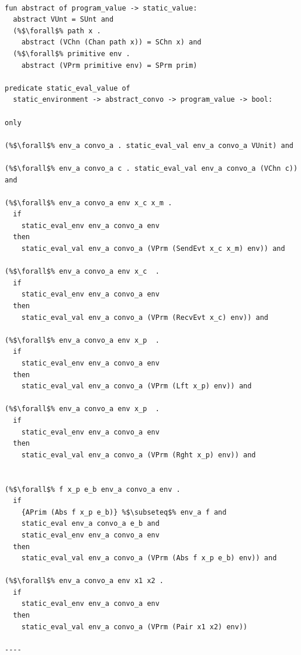 \documentclass{article}
\begin{document}
\begin{lstlisting}[language=logic, escapechar=\%]

fun abstract of program_value -> static_value:
  abstract VUnt = SUnt and 
  (%$\forall$% path x . 
    abstract (VChn (Chan path x)) = SChn x) and
  (%$\forall$% primitive env .
    abstract (VPrm primitive env) = SPrm prim)

predicate static_eval_value of
  static_environment -> abstract_convo -> program_value -> bool: 

only

(%$\forall$% env_a convo_a . static_eval_val env_a convo_a VUnit) and

(%$\forall$% env_a convo_a c . static_eval_val env_a convo_a (VChn c)) and

(%$\forall$% env_a convo_a env x_c x_m .
  if
    static_eval_env env_a convo_a env
  then
    static_eval_val env_a convo_a (VPrm (SendEvt x_c x_m) env)) and

(%$\forall$% env_a convo_a env x_c  .
  if
    static_eval_env env_a convo_a env
  then
    static_eval_val env_a convo_a (VPrm (RecvEvt x_c) env)) and

(%$\forall$% env_a convo_a env x_p  .
  if
    static_eval_env env_a convo_a env
  then
    static_eval_val env_a convo_a (VPrm (Lft x_p) env)) and

(%$\forall$% env_a convo_a env x_p  .
  if
    static_eval_env env_a convo_a env
  then
    static_eval_val env_a convo_a (VPrm (Rght x_p) env)) and


(%$\forall$% f x_p e_b env_a convo_a env .
  if
    {APrim (Abs f x_p e_b)} %$\subseteq$% env_a f and 
    static_eval env_a convo_a e_b and 
    static_eval_env env_a convo_a env
  then
    static_eval_val env_a convo_a (VPrm (Abs f x_p e_b) env)) and

(%$\forall$% env_a convo_a env x1 x2 .
  if
    static_eval_env env_a convo_a env
  then
    static_eval_val env_a convo_a (VPrm (Pair x1 x2) env))

----

\end{lstlisting}
\end{document}
